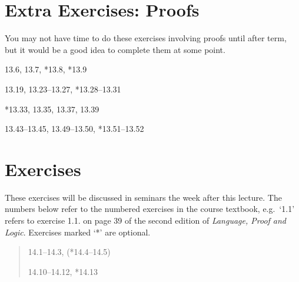\documentclass[12pt]{extarticle}
\begin{document}
\begin{multicols*}{3}
\section{Extra Exercises: Proofs}
 
You may not have time to do these exercises involving proofs until after term, but it would be a good idea to complete them at some point.
 
\hspace{5mm} 13.6, 13.7, *13.8, *13.9
 
\hspace{5mm} 13.19, 13.23--13.27, *13.28--13.31
 
\hspace{5mm} *13.33, 13.35, 13.37, 13.39
 
\hspace{5mm} 13.43--13.45, 13.49--13.50, *13.51--13.52
 
\vfill
\begin{minipage}{\columnwidth}
\section{Exercises}
These exercises will be discussed in seminars the week after this lecture.
The numbers below refer to the numbered exercises in the course textbook, e.g.\ `1.1' refers to exercise 1.1. on page 39 of the second edition of \emph{Language, Proof and Logic}. Exercises marked `*' are optional.
 
\begin{quote}
14.1--14.3, (*14.4--14.5)
 
14.10--14.12, *14.13
 
\end{quote}
\end{minipage}
 


\end{multicols*}
\end{document}
